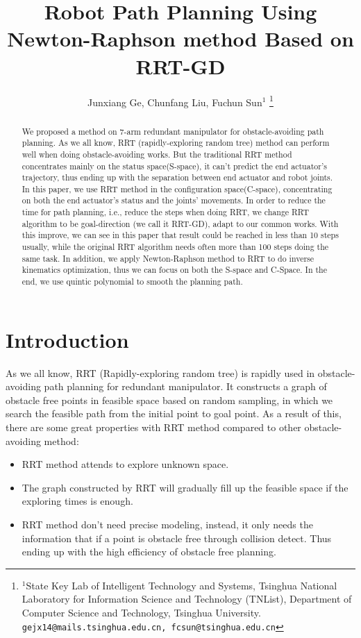 \documentclass[letterpaper, 10 pt, conference]{ieeeconf}  %
\title{\LARGE \bf
Robot Path Planning Using Newton-Raphson method Based on RRT-GD
}
\author{Junxiang Ge, Chunfang Liu, Fuchun Sun$^{1}$%
\thanks{$^{1}$State Key Lab of Intelligent Technology and Systems, Tsinghua National Laboratory for Information Science and Technology (TNList), Department of Computer Science and Technology, Tsinghua University.
        {\tt\small gejx14@mails.tsinghua.edu.cn, fcsun@tsinghua.edu.cn}}%
}
\begin{document}
\maketitle
\thispagestyle{empty}
\pagestyle{empty}


\begin{abstract}

We proposed a method on 7-arm redundant manipulator for obstacle-avoiding path planning. As we all know, RRT (rapidly-exploring random tree) method can perform well when doing obstacle-avoiding works. But the traditional RRT method concentrates mainly on the status space(S-space), it can’t predict the end actuator’s trajectory, thus ending up with the separation between end actuator and robot joints. In this paper, we use RRT method in the configuration space(C-space), concentrating on both the end actuator’s status and the joints’ movements. In order to reduce the time for path planning, i.e., reduce the steps when doing RRT, we change RRT algorithm to be goal-direction (we call it RRT-GD), adapt to our common works. With this improve, we can see in this paper that result could be reached in less than 10 steps usually, while the original RRT algorithm needs often more than 100 steps doing the same task. In addition, we apply Newton-Raphson method to RRT to do inverse kinematics optimization, thus we can focus on both the S-space and C-Space. In the end, we use quintic polynomial to smooth the planning path.

\end{abstract}


\section{Introduction}

As we all know, RRT (Rapidly-exploring random tree) is rapidly used in obstacle-avoiding path planning for redundant manipulator. It constructs a graph of obstacle free points in feasible space based on random sampling, in which we search the feasible path from the initial point to goal point. As a result of this, there are some great properties with RRT method compared to other obstacle-avoiding method:
\begin{itemize}
\item RRT method attends to explore unknown space. 
\item The graph constructed by RRT will gradually fill up the feasible space if the exploring times is enough.
\item RRT method don’t need precise modeling, instead, it only needs the information that if a point is obstacle free through collision detect. Thus ending up with the high efficiency of obstacle free planning.
\end{itemize}
\end{document}
